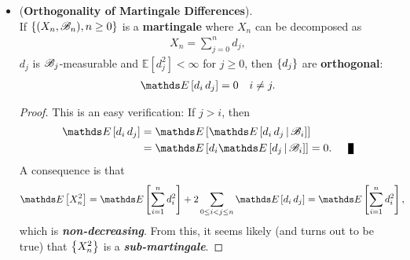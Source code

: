 \documentclass[11pt]{article}
\begin{document}
\begin{itemize}
\item \begin{theorem} (\textbf{Orthogonality of Martingale Differences}). \citep{resnick2013probability}\\
If $\left\{(X_n, {\mathscr B}_n), n \ge 0\right\}$ is a \textbf{martingale} where $X_n$ can be decomposed as
\begin{align*}
X_n = \sum_{j=0}^{n} d_j, 
\end{align*}  $d_j$ is ${\mathscr B}_j$-measurable and  $\mathds{E}[d_j^2] < \infty$ for $j \ge 0$, then $\left\{d_j\right\}$ are \textbf{orthogonal}:
\begin{align*}
\E{}{d_i\,d_j} = 0 \quad i \neq j.
\end{align*}
\end{theorem}
\begin{proof}
This is an easy verification: If $j > i$, then
\begin{align*}
\E{}{d_i\, d_j} &= \E{}{\E{}{d_i\, d_j \,|\, \srB_i}}\\
&= \E{}{d_i \E{}{d_j \,|\, \srB_i}} = 0. \qed
\end{align*}
A consequence is that
\begin{align*}
\E{}{X_n^2} &= \E{}{\sum_{i=1}^{n}d_i^2} + 2\sum_{0 \le i < j \le n}\E{}{d_i\,d_j} = \E{}{\sum_{i=1}^{n}d_i^2},
\end{align*}
which is \textbf{\emph{non-decreasing}}. From this, it seems likely (and turns out to be true) that $\left\{X_n^2\right\}$ is a \emph{\textbf{sub-martingale}}. 
\end{proof}
\end{itemize}
\end{document}
